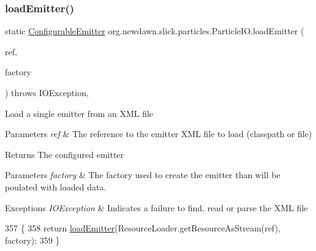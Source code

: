 \subsubsection{\texorpdfstring{load\+Emitter()}{loadEmitter()}\hspace{0.1cm}{\footnotesize\ttfamily [4/6]}}
{\footnotesize\ttfamily static \mbox{\hyperlink{classorg_1_1newdawn_1_1slick_1_1particles_1_1_configurable_emitter}{Configurable\+Emitter}} org.\+newdawn.\+slick.\+particles.\+Particle\+I\+O.\+load\+Emitter (\begin{DoxyParamCaption}\item[{String}]{ref,  }\item[{\mbox{\hyperlink{interfaceorg_1_1newdawn_1_1slick_1_1particles_1_1_configurable_emitter_factory}{Configurable\+Emitter\+Factory}}}]{factory }\end{DoxyParamCaption}) throws I\+O\+Exception\hspace{0.3cm}{\ttfamily [inline]}, {\ttfamily [static]}}

Load a single emitter from an X\+ML file


\begin{DoxyParams}{Parameters}
{\em ref} & The reference to the emitter X\+ML file to load (classpath or file) \\
\hline
\end{DoxyParams}
\begin{DoxyReturn}{Returns}
The configured emitter 
\end{DoxyReturn}

\begin{DoxyParams}{Parameters}
{\em factory} & The factory used to create the emitter than will be poulated with loaded data. \\
\hline
\end{DoxyParams}

\begin{DoxyExceptions}{Exceptions}
{\em I\+O\+Exception} & Indicates a failure to find, read or parse the X\+ML file \\
\hline
\end{DoxyExceptions}

\begin{DoxyCode}
357                                                                    \{
358         \textcolor{keywordflow}{return} \mbox{\hyperlink{classorg_1_1newdawn_1_1slick_1_1particles_1_1_particle_i_o_af2afc8b074ac941f5b987b1396747a0f}{loadEmitter}}(ResourceLoader.getResourceAsStream(ref), factory);
359     \}
\end{DoxyCode}
\mbox{\label{classorg_1_1newdawn_1_1slick_1_1particles_1_1_particle_i_o_a1179316ef36ea0ef0515190ec634f1fe}} 
